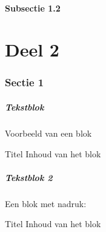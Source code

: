 \documentclass{beamer}
\begin{document}
\subsection{Subsectie 1.2}

\part{Deel 2}

\section{Sectie 1}

\begin{frame}
  \frametitle{Tekstblok}

  Voorbeeld van een \alert{blok}

  \begin{block}{Titel}
    Inhoud van het \alert{blok}
  \end{block}

\end{frame}


\begin{frame}
  \frametitle{Tekstblok 2}

  Een blok met nadruk:

  \begin{alertblock}{Titel}
    Inhoud van het blok
  \end{alertblock}

\end{frame}

\end{document}
